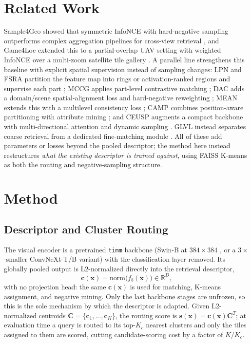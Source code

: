 \documentclass[conference]{IEEEtran}
\begin{document}
\section{Related Work}
Sample4Geo showed that symmetric InfoNCE with hard-negative sampling
outperforms complex aggregation pipelines for cross-view retrieval
\cite{deuser2023sample4geo}, and Game4Loc extended this to a
partial-overlap UAV setting with weighted InfoNCE over a multi-zoom
satellite tile gallery \cite{ji2024game4loc}. A parallel line strengthens
this baseline with explicit spatial supervision instead of sampling
changes: LPN and FSRA partition the feature map into rings or
activation-ranked regions and supervise each part
\cite{wang2021lpn,dai2022fsra}; MCCG applies part-level contrastive
matching \cite{shen2024mccg}; DAC adds a domain/scene spatial-alignment
loss and hard-negative reweighting \cite{xia2024dac}; MEAN extends this
with a multilevel consistency loss \cite{chen2025mean}; CAMP combines
position-aware partitioning with attribute mining \cite{wu2024camp}; and
CEUSP augments a compact backbone with multi-directional attention and
dynamic sampling \cite{xu2025ceusp}. GLVL instead separates coarse
retrieval from a dedicated fine-matching module \cite{li2023glvl}. All of
these add parameters or losses beyond the pooled descriptor; the method
here instead restructures \emph{what the existing descriptor is trained
against}, using FAISS K-means \cite{johnson2019billion,macqueen1967methods}
as both the routing and negative-sampling structure.

\section{Method}
\subsection{Descriptor and Cluster Routing}
The visual encoder is a pretrained \texttt{timm} backbone (Swin-B at
$384{\times}384$ \cite{liu2021swin}, or a $3\times$-smaller ConvNeXt-T/B
variant) with the classification layer removed. Its globally pooled
output is L2-normalized directly into the retrieval descriptor,
\begin{equation}
    \mathbf{c}(\mathbf{x}) = \mathrm{norm}\big(f_b(\mathbf{x})\big)
    \in \mathbb{R}^{D},
\end{equation}
with no projection head: the same $\mathbf{c}(\mathbf{x})$ is used for
matching, K-means assignment, and negative mining. Only the last backbone
stages are unfrozen, so this is the sole mechanism by which the
descriptor is adapted. Given L2-normalized centroids
$\mathbf{C}=\{\mathbf{c}_1,\dots,\mathbf{c}_K\}$, the routing score is
$\mathbf{s}(\mathbf{x})=\mathbf{c}(\mathbf{x})\mathbf{C}^T$; at evaluation
time a query is routed to its top-$K_c$ nearest clusters and only the
tiles assigned to them are scored, cutting candidate-scoring cost by a
factor of $K/K_c$.
\end{document}
